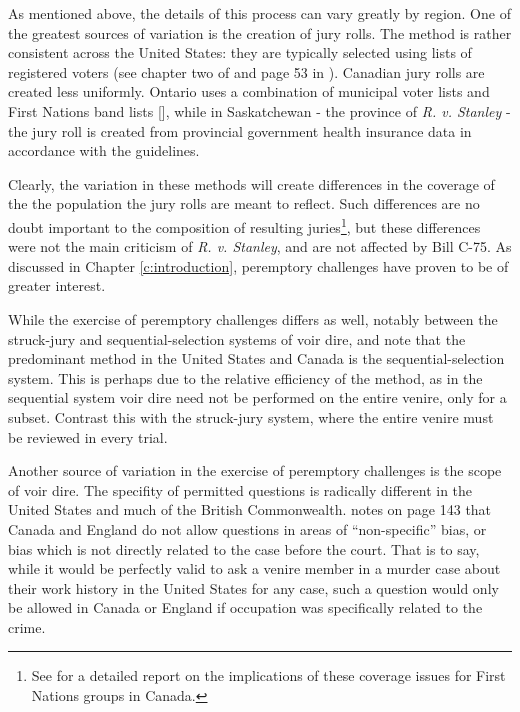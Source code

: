 As mentioned above, the details of this process can vary greatly by region. One of the greatest sources of variation is the
creation of jury rolls. The method is rather consistent across the United States: they are typically selected using lists of
registered voters (see chapter two of \cite{vandykejurysel} and page
53 in \cite{hansvidjudging}). Canadian jury rolls are created less uniformly. Ontario uses a combination of municipal voter lists and First Nations band lists [\cite{ontariojuryroll}],
while in Saskatchewan - the province of \textit{R. v. Stanley} - the jury roll is created from provincial government health
insurance data in accordance with the \cite{saskjuryact} guidelines.

Clearly, the variation in these methods will create differences in the coverage of the the population the jury rolls are meant to
reflect. Such differences are no doubt important to the composition of resulting juries\footnote{See \cite{iacobuccireport} for a
  detailed report on the implications of these coverage issues for First Nations groups in Canada.}, but these differences were not
the main criticism of \textit{R. v. Stanley}, and are not affected by Bill C-75. As discussed in Chapter \ref{c:introduction},
peremptory challenges have proven to be of greater interest.

While the exercise of peremptory challenges differs as well, notably between the struck-jury and
sequential-selection systems of voir dire, \cite{ford2010} and \cite{vandykejurysel} note that the predominant method in the
United States and Canada is the sequential-selection system. This is perhaps due to the relative efficiency of the method, as in
the sequential system voir dire need not be performed on the entire venire, only for a subset. Contrast this with the struck-jury
system, where the entire venire must be reviewed in every trial.

Another source of variation in the exercise of peremptory challenges is the scope of voir dire. The specifity of permitted
questions is radically different in the United States and much of the British Commonwealth. \cite{vandykejurysel} notes on page
143 that Canada and England do not allow questions in areas of ``non-specific'' bias, or bias which is not directly
related to the case before the court. That is to say, while it would be perfectly valid to ask a venire member in a murder case
about their work history in the United States for any case, such a question would only be allowed in Canada or England
if occupation was specifically related to the crime.

